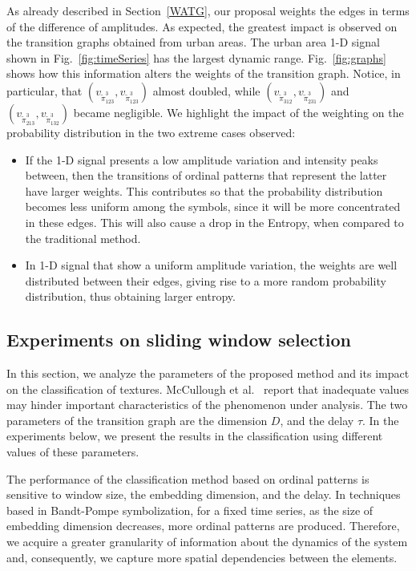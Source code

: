 \documentclass[journal]{IEEEtran}
\begin{document}
\begin{itemize}
	As already described in Section~\ref{WATG}, our proposal weights the edges in terms of the difference of amplitudes.
	As expected, the greatest impact is observed on the transition graphs obtained from urban areas.
	The urban area 1-D signal shown in Fig.~\ref{fig:timeSeries} has the largest dynamic range.
	Fig.~\ref{fig:graphs} shows how this information alters the weights of the transition graph.
	Notice, in particular, that 
	$(v_{\widetilde \pi^3_{123}}, v_{\widetilde \pi^3_{123}})$ almost doubled, while 
	$(v_{\widetilde \pi^3_{312}}, v_{\widetilde \pi^3_{231}})$ and $(v_{\widetilde \pi^3_{213}}, v_{\widetilde \pi^3_{132}})$ became negligible.
	We highlight the impact of the weighting on the probability distribution in the two extreme cases observed:
	\begin{itemize}
		\item If the 1-D signal presents a low amplitude variation and intensity peaks between, then the transitions of ordinal patterns that represent the latter have larger weights.
		This contributes so that the probability distribution becomes less uniform among the symbols, since it will be more concentrated in these edges.
		This will also cause a drop in the Entropy, when compared to the traditional method.
		\item In 1-D signal that show a uniform amplitude variation, the weights are well distributed between their edges, giving rise to a more random probability distribution, thus obtaining larger entropy.
	\end{itemize}
	
	\subsection{Experiments on sliding window selection}
	
	In this section, we analyze the parameters of the proposed method and its impact on the classification of textures.
	McCullough et al.~\cite{McCullough2015lagged} report that inadequate values may hinder important characteristics of the phenomenon under analysis.
	The two parameters of the transition graph are the dimension $D$, and the delay $\tau$.
	In the experiments below, we present the results in the classification using different values of these parameters.
	
	The performance of the classification method based on ordinal patterns is sensitive to window size, the embedding dimension, and the delay.
	In techniques based in Bandt-Pompe symbolization, for a fixed time series, as the size of embedding dimension decreases, more ordinal patterns are produced.
	Therefore, we acquire a greater granularity of information about the dynamics of the system and, consequently, we capture more spatial dependencies between the elements.
	

\end{itemize}
\end{document}

